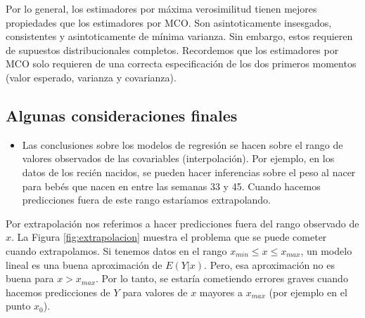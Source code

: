 \documentclass[
]{article}
\providecommand{\tightlist}{%
  \setlength{\itemsep}{0pt}\setlength{\parskip}{0pt}}
\begin{document}
Por lo general, los estimadores por máxima verosimilitud tienen mejores propiedades que los estimadores por MCO. Son asintoticamente insesgados, consistentes y asintoticamente de mínima varianza. Sin embargo, estos requieren de supuestos distribucionales completos. Recordemos que los estimadores por MCO solo requieren de una correcta especificación de los dos primeros momentos (valor esperado, varianza y covarianza).

\hypertarget{algunas-consideraciones-finales}{%
\subsection{Algunas consideraciones finales}\label{algunas-consideraciones-finales}}

\begin{itemize}
\tightlist
\item
  Las conclusiones sobre los modelos de regresión se hacen sobre el rango de valores observados de las covariables (interpolación). Por ejemplo, en los datos de los recién nacidos, se pueden hacer inferencias sobre el peso al nacer para bebés que nacen en entre las semanas 33 y 45. Cuando hacemos predicciones fuera de este rango estaríamos extrapolando.
\end{itemize}

Por extrapolación nos referimos a hacer predicciones fuera del rango observado de \(x\). La Figura \ref{fig:extrapolacion} muestra el problema que se puede cometer cuando extrapolamos. Si tenemos datos en el rango \(x_{min} \leq x \leq x_{max}\), un modelo lineal es una buena aproximación de \(E(Y|x)\). Pero, esa aproximación no es buena para \(x>x_{max}\). Por lo tanto, se estaría cometiendo errores graves cuando hacemos predicciones de \(Y\) para valores de \(x\) mayores a \(x_{max}\) (por ejemplo en el punto \(x_{0}\)).
\end{document}

